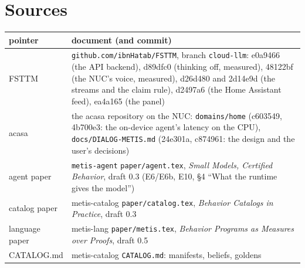 \documentclass[11pt]{article}
\newcommand{\agent}{\texttt{metis-agent}}
\begin{document}
\section*{Sources}

\begin{small}
\begin{tabular}{@{}p{3.4cm}p{11.4cm}@{}}
\toprule
pointer & document (and commit) \\
\midrule
FSTTM & \texttt{github.com/ibnHatab/FSTTM}, branch \texttt{cloud-llm}: e0a9466 (the API backend), d89dfc0 (thinking off, measured), 48122bf (the NUC's voice, measured), d26d480 and 2d14e9d (the streams and the claim rule), d2497a6 (the Home Assistant feed), ea4a165 (the panel) \\
acasa & the acasa repository on the NUC: \texttt{domains/home} (c603549, 4b700e3: the on-device agent's latency on the CPU), \texttt{docs/DIALOG-METIS.md} (24e301a, c874961: the design and the user's decisions) \\
agent paper & \agent{} \texttt{paper/agent.tex}, \emph{Small Models, Certified Behavior}, draft 0.3 (E6/E6b, E10, \S4 ``What the runtime gives the model'') \\
catalog paper & metis-catalog \texttt{paper/catalog.tex}, \emph{Behavior Catalogs in Practice}, draft 0.3 \\
language paper & metis-lang \texttt{paper/metis.tex}, \emph{Behavior Programs as Measures over Proofs}, draft 0.5 \\
CATALOG.md & metis-catalog \texttt{CATALOG.md}: manifests, beliefs, goldens \\
\bottomrule
\end{tabular}
\end{small}



\end{document}
